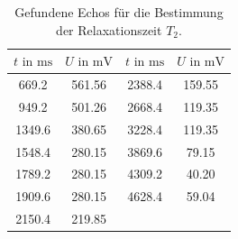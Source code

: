 \begin{table}
  \centering
  \caption{Gefundene Echos für die Bestimmung der Relaxationszeit $T_{2}$.}
  \label{tab:t2_fitwerte}
  \begin{tabular}{c c| c c}
  \toprule
  $t \text{ in } \si{\milli\second}$ & $U \text{ in } \si{\milli\volt}$ &  $t \text{ in } \si{\milli\second}$ & $U \text{ in } \si{\milli\volt}$\\

\midrule
669.2	&	561.56  & 2388.4	&	159.55  \\
949.2	&	501.26  & 2668.4	&	119.35  \\
1349.6	&	380.65 & 3228.4	&	119.35   \\
1548.4	&	280.15 & 3869.6	&	79.15    \\
1789.2	&	280.15 & 4309.2	&	40.20    \\
1909.6	&	280.15 & 4628.4	&	59.04    \\
2150.4	&	219.85 & &  \\
  \bottomrule
  \end{tabular}
\end{table}


\FloatBarrier
